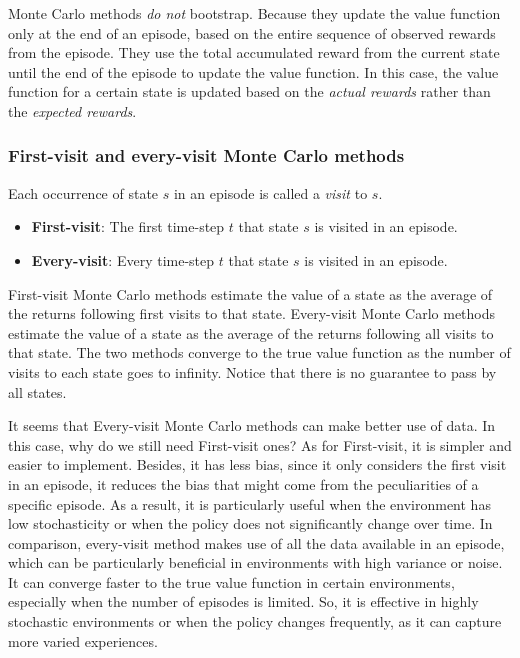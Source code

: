 Monte Carlo methods \emph{do not} bootstrap. Because they update the value function only at the end of an episode, based on the entire sequence of observed rewards from the episode. They use the total accumulated reward from the current state until the end of the episode to update the value function. In this case, the value function for a certain state is updated based on the \emph{actual rewards} rather than the \emph{expected rewards}.

\subsubsection*{First-visit and every-visit Monte Carlo methods}\label{sec:fv-ev}

Each occurrence of state $s$ in an episode is called a \emph{visit} to $s$.
\begin{itemize}
    \item \textbf{First-visit}: The first time-step $t$ that state $s$ is visited in an episode.
    \item \textbf{Every-visit}: Every time-step $t$ that state $s$ is visited in an episode.
\end{itemize}

First-visit Monte Carlo methods estimate the value of a state as the average of the returns following first visits to that state. Every-visit Monte Carlo methods estimate the value of a state as the average of the returns following all visits to that state. The two methods converge to the true value function as the number of visits to each state goes to infinity. Notice that there is no guarantee to pass by all states.

It seems that Every-visit Monte Carlo methods can make better use of data. In this case, why do we still need First-visit ones? As for First-visit, it is simpler and easier to implement. Besides, it has less bias, since it only considers the first visit in an episode, it reduces the bias that might come from the peculiarities of a specific episode. As a result, it is particularly useful when the environment has low stochasticity or when the policy does not significantly change over time. In comparison, every-visit method makes use of all the data available in an episode, which can be particularly beneficial in environments with high variance or noise. It can converge faster to the true value function in certain environments, especially when the number of episodes is limited. So, it is effective in highly stochastic environments or when the policy changes frequently, as it can capture more varied experiences.

